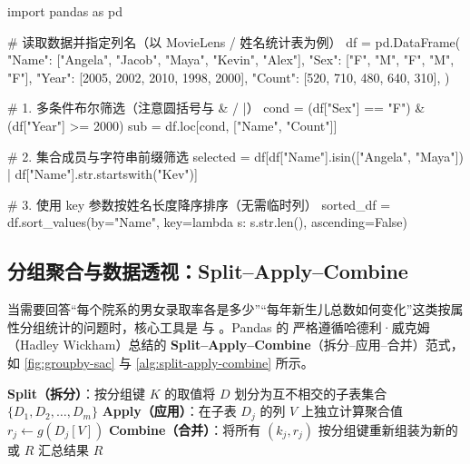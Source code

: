 \begin{codeblock}[language=Python,caption={DataFrame 查询、布尔过滤与自定义键排序示例},label=lst:pandas-query]
import pandas as pd

# 读取数据并指定列名（以 MovieLens / 姓名统计表为例）
df = pd.DataFrame({
    "Name": ["Angela", "Jacob", "Maya", "Kevin", "Alex"],
    "Sex":  ["F", "M", "F", "M", "F"],
    "Year": [2005, 2002, 2010, 1998, 2000],
    "Count": [520, 710, 480, 640, 310],
})

# 1. 多条件布尔筛选（注意圆括号与 & / |）
cond = (df["Sex"] == "F") & (df["Year"] >= 2000)
sub = df.loc[cond, ["Name", "Count"]]

# 2. 集合成员与字符串前缀筛选
selected = df[df["Name"].isin(["Angela", "Maya"]) | df["Name"].str.startswith("Kev")]

# 3. 使用 key 参数按姓名长度降序排序（无需临时列）
sorted_df = df.sort_values(by="Name", key=lambda s: s.str.len(), ascending=False)
\end{codeblock}

\subsection{分组聚合与数据透视：Split–Apply–Combine}

当需要回答“每个院系的男女录取率各是多少”“每年新生儿总数如何变化”这类按属性分组统计的问题时，核心工具是  与 。Pandas 的  严格遵循哈德利·威克姆（Hadley Wickham）总结的 \textbf{Split–Apply–Combine}（拆分–应用–合并）范式，如 \cref{fig:groupby-sac} 与 \cref{alg:split-apply-combine} 所示。


\begin{algorithm}\label{alg:split-apply-combine}
\begin{algsteps}
  \State \textbf{Split（拆分）}：按分组键 $K$ 的取值将 $D$ 划分为互不相交的子表集合 $\{D_1, D_2, \dots, D_m\}$
    \State \textbf{Apply（应用）}：在子表 $D_j$ 的列 $V$ 上独立计算聚合值 $r_j \gets g(D_j[V])$
  \EndFor
  \State \textbf{Combine（合并）}：将所有 $(k_j, r_j)$ 按分组键重新组装为新的  或  $R$
  \State \Return 汇总结果 $R$
\end{algsteps}
\end{algorithm}

